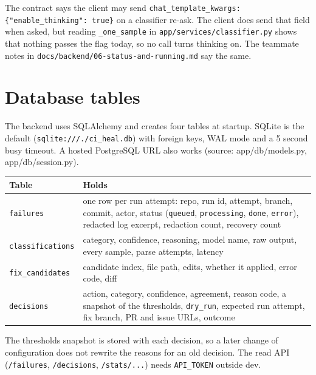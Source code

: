 \documentclass[11pt,a4paper]{report}
\begin{document}
The contract says the client may send \texttt{chat\_\allowbreak{}template\_\allowbreak{}kwargs: \{"enable\_\allowbreak{}thinking": true\}} on a classifier re-ask. The client does send that field when asked, but reading \texttt{\_\allowbreak{}one\_\allowbreak{}sample} in \texttt{app/\allowbreak{}services/\allowbreak{}classifier.\allowbreak{}py} shows that nothing passes the flag today, so no call turns thinking on. The teammate notes in \texttt{docs/\allowbreak{}backend/\allowbreak{}06-\allowbreak{}status-\allowbreak{}and-\allowbreak{}running.\allowbreak{}md} say the same.

\section{Database tables}

The backend uses SQLAlchemy and creates four tables at startup. SQLite is the default (\texttt{sqlite:/\allowbreak{}/\allowbreak{}/\allowbreak{}.\allowbreak{}/\allowbreak{}ci\_\allowbreak{}heal.\allowbreak{}db}) with foreign keys, WAL mode and a 5 second busy timeout. A hosted PostgreSQL URL also works (source: app/db/models.py, app/db/session.py).

\begin{longtable}{>{\raggedright\arraybackslash}p{0.221\dimexpr\linewidth-4\tabcolsep\relax}>{\raggedright\arraybackslash}p{0.779\dimexpr\linewidth-4\tabcolsep\relax}}
\toprule
\textbf{Table} & \textbf{Holds} \\
\midrule
\endhead
\texttt{failures} & one row per run attempt: repo, run id, attempt, branch, commit, actor, status (\texttt{queued}, \texttt{processing}, \texttt{done}, \texttt{error}), redacted log excerpt, redaction count, recovery count \\
\texttt{classifications} & category, confidence, reasoning, model name, raw output, every sample, parse attempts, latency \\
\texttt{fix\_\allowbreak{}candidates} & candidate index, file path, edits, whether it applied, error code, diff \\
\texttt{decisions} & action, category, confidence, agreement, reason code, a snapshot of the thresholds, \texttt{dry\_\allowbreak{}run}, expected run attempt, fix branch, PR and issue URLs, outcome \\
\bottomrule
\end{longtable}

The thresholds snapshot is stored with each decision, so a later change of configuration does not rewrite the reasons for an old decision. The read API (\texttt{/\allowbreak{}failures}, \texttt{/\allowbreak{}decisions}, \texttt{/\allowbreak{}stats/\allowbreak{}.\allowbreak{}.\allowbreak{}.\allowbreak{}}) needs \texttt{API\_\allowbreak{}TOKEN} outside dev.
\end{document}
